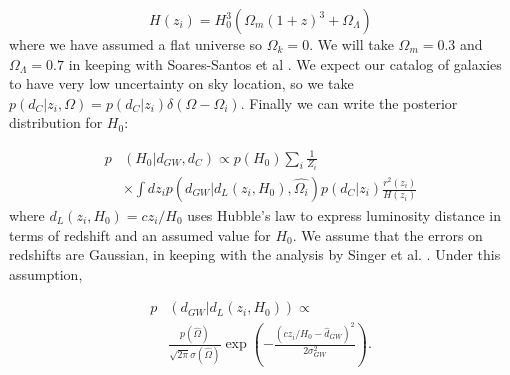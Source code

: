 \begin{equation}
H(z_i) = H_0^3 \left(\Omega_m (1+z)^3 + \Omega_\Lambda\right)
\end{equation}
where we have assumed a flat universe so $\Omega_k = 0$. We will take $\Omega_m = 0.3$ and $\Omega_\Lambda = 0.7$ in keeping with Soares-Santos et al \cite{GW170814_DES}. We expect our catalog of galaxies to have very low uncertainty on sky location, so we take $p(d_C|z_i,\Omega)=p(d_C|z_i)\delta(\Omega - \Omega_i)$. Finally we can write the posterior distribution for $H_0$:

\begin{align}
     p&(H_0|d_{GW}, d_C)\propto p(H_0) \sum_i \frac{1}{Z_i} \nonumber\\
     &\times \int dz_i p\left(d_{GW}|d_L(z_i, H_0), \hat{\Omega_{i}}\right)p(d_C|z_i)\frac{r^2 (z_i)}{H(z_i)}
    \label{eq: finaleq}
\end{align}
where $d_L(z_i, H_0) = cz_i / H_0$ uses Hubble's law to express luminosity distance in terms of redshift and an assumed value for $H_0$. We assume that the errors on redshifts are Gaussian, in keeping with the analysis by Singer et al. \cite{Singer_2016}. Under this assumption,

\begin{align}
    p&\left(d_{GW}|d_L(z_i, H_0)\right)\propto \nonumber\\
    &\frac{p(\hat{\Omega})}{\sqrt{2\pi}\sigma(\hat{\Omega})} \exp\left(-\frac{(cz_i/H_0 - \hat{d}_{GW})^2}{2\sigma_{GW}^2}\right).
    \label{eq:GW_like}
\end{align}
